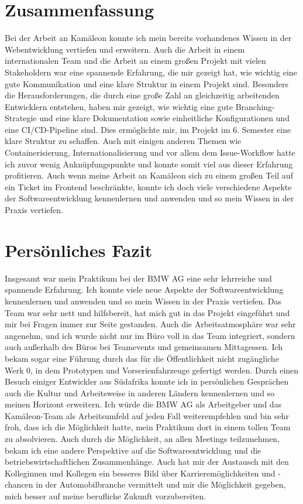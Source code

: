 \documentclass[11pt, a4paper, oneside]{scrartcl}
\begin{document}
    \section{Zusammenfassung}
    Bei der Arbeit an Kamäleon konnte ich mein bereits vorhandenes Wissen in der Webentwicklung
    vertiefen und erweitern.
    Auch die Arbeit in einem internationalen Team und die Arbeit an einem großen Projekt mit vielen
    Stakeholdern war eine spannende Erfahrung, die mir gezeigt hat, wie wichtig eine gute
    Kommunikation und eine klare Struktur in einem Projekt sind.
    Besonders die Herausforderungen, die durch eine große Zahl an gleichzeitig arbeitenden
    Entwicklern entstehen, haben mir gezeigt, wie wichtig eine gute Branching-Strategie und eine
    klare Dokumentation sowie einheitliche Konfigurationen und eine CI/CD-Pipeline sind.
    Dies ermöglichte mir, im Projekt im 6. Semester eine klare Struktur zu schaffen.
    Auch mit einigen anderen Themen wie Containerisierung, Internationalisierung und vor allem dem
    Issue-Workflow hatte ich zuvor wenig Anknüpfungspunkte und konnte somit viel aus dieser
    Erfahrung profitieren.
    Auch wenn meine Arbeit an Kamäleon sich zu einem großen Teil auf ein Ticket im Frontend
    beschränkte, konnte ich doch viele verschiedene Aspekte der Softwareentwicklung kennenlernen und
    anwenden und so mein Wissen in der Praxis vertiefen.

    \section{Persönliches Fazit}
    Insgesamt war mein Praktikum bei der BMW AG eine sehr lehrreiche und spannende Erfahrung.
    Ich konnte viele neue Aspekte der Softwareentwicklung kennenlernen und anwenden und so mein
    Wissen in der Praxis vertiefen.
    Das Team war sehr nett und hilfsbereit, hat mich gut in das Projekt eingeführt und mir bei
    Fragen immer zur Seite gestanden.
    Auch die Arbeitsatmosphäre war sehr angenehm, und ich wurde nicht nur im Büro voll in das Team
    integriert, sondern auch außerhalb des Büros bei Teamevents und gemeinsamen Mittagessen.
    Ich bekam sogar eine Führung durch das für die Öffentlichkeit nicht zugängliche Werk 0, in dem
    Prototypen und Vorserienfahrzeuge gefertigt werden.
    Durch einen Besuch einiger Entwickler aus Südafrika konnte ich in persönlichen Gesprächen auch
    die Kultur und Arbeitsweise in anderen Ländern kennenlernen und so meinen Horizont erweitern.
    Ich würde die BMW AG als Arbeitgeber und das Kamäleon-Team als Arbeitsumfeld auf jeden Fall
    weiterempfehlen und bin sehr froh, dass ich die Möglichkeit hatte, mein Praktikum dort
    in einem tollen Team zu absolvieren.
    Auch durch die Möglichkeit, an allen Meetings teilzunehmen, bekam ich eine andere Perspektive
    auf die Softwareentwicklung und die betriebswirtschaftlichen Zusammenhänge.
    Auch hat mir der Austausch mit den Kolleginnen und Kollegen ein besseres Bild über
    Karrieremöglichkeiten und -chancen in der Automobilbranche vermittelt und mir die Möglichkeit
    gegeben, mich besser auf meine berufliche Zukunft vorzubereiten.
\end{document}

